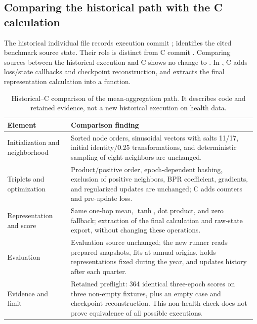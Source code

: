 \subsection{Comparing the historical path with the C calculation}

The historical individual file records execution commit ;  identifies the cited benchmark source state. Their role is distinct from C commit . Comparing sources between the historical execution and C shows no change to . In , C adds loss/state callbacks and checkpoint reconstruction, and extracts the final representation calculation into a function.

\begin{table}[!htbp]\centering\footnotesize
\caption{Historical--C comparison of the mean-aggregation path. It describes code and retained evidence, not a new historical execution on health data.}
\begin{tabularx}{\linewidth}{@{}p{34mm}X@{}}
\toprule
Element & Comparison finding\\
\midrule
Initialization and neighborhood & Sorted node orders, sinusoidal vectors with salts 11/17, initial identity/0.25 transformations, and deterministic sampling of eight neighbors are unchanged.\\
Triplets and optimization & Product/positive order, epoch-dependent hashing, exclusion of positive neighbors, BPR coefficient, gradients, and regularized updates are unchanged; C adds counters and pre-update loss.\\
Representation and score & Same one-hop mean, $\tanh$, dot product, and zero fallback; extraction of the final calculation and raw-state export, without changing these operations.\\
Evaluation & Evaluation source unchanged; the new runner reads prepared snapshots, fits at annual origins, holds representations fixed during the year, and updates history after each quarter.\\
Evidence and limit & Retained preflight: 364 identical three-epoch scores on three non-empty fixtures, plus an empty case and checkpoint reconstruction. This non-health check does not prove equivalence of all possible executions.\\
\bottomrule
\end{tabularx}
\end{table}

